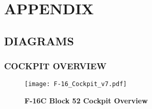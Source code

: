 \appendix
\chapter{APPENDIX}
\localtableofcontents
\cleardoublepage


\section{DIAGRAMS}

\subsection{COCKPIT OVERVIEW}
\begin{figure}[h]
    \centering
    \texttt{[image: F-16\_Cockpit\_v7.pdf]}
    \caption{\textbf{F-16C Block 52 Cockpit Overview}}
    \label{fig:cockpitoverview}
\end{figure}

\cleardoublepage